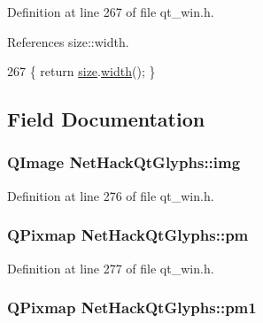 Definition at line 267 of file qt\+\_\+win.\+h.



References size\+::width.


\begin{DoxyCode}
267 \{ \textcolor{keywordflow}{return} \hyperlink{structsize}{size}.\hyperlink{structsize_afd8efe4755a96dfc77d03cb9bc02eb62}{width}(); \}
\end{DoxyCode}


\subsection{Field Documentation}
\hypertarget{classNetHackQtGlyphs_a9edcebfbacfad5f904b4090e3e17e6ca}{
\subsubsection[{img}]{\setlength{\rightskip}{0pt plus 5cm}Q\+Image Net\+Hack\+Qt\+Glyphs\+::img\hspace{0.3cm}{\ttfamily [private]}}}\label{classNetHackQtGlyphs_a9edcebfbacfad5f904b4090e3e17e6ca}


Definition at line 276 of file qt\+\_\+win.\+h.

\hypertarget{classNetHackQtGlyphs_a69278ce42d9f4357ab883f159646839d}{
\subsubsection[{pm}]{\setlength{\rightskip}{0pt plus 5cm}Q\+Pixmap Net\+Hack\+Qt\+Glyphs\+::pm\hspace{0.3cm}{\ttfamily [private]}}}\label{classNetHackQtGlyphs_a69278ce42d9f4357ab883f159646839d}


Definition at line 277 of file qt\+\_\+win.\+h.

\hypertarget{classNetHackQtGlyphs_a42bbc132c3aaac2ba555a3fc7ae9c60a}{
\subsubsection[{pm1}]{\setlength{\rightskip}{0pt plus 5cm}Q\+Pixmap Net\+Hack\+Qt\+Glyphs\+::pm1\hspace{0.3cm}{\ttfamily [private]}}}\label{classNetHackQtGlyphs_a42bbc132c3aaac2ba555a3fc7ae9c60a}



